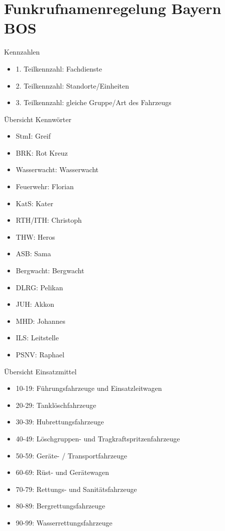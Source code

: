 \section{Funkrufnamenregelung Bayern BOS}
\begin{normbox}{Kennzahlen}
    \begin{itemize}
        \item 1. Teilkennzahl: Fachdienste
        \item 2. Teilkennzahl: Standorte/Einheiten
        \item 3. Teilkennzahl: gleiche Gruppe/Art des Fahrzeugs
    \end{itemize}
\end{normbox}
\begin{hintbox}{Übersicht Kennwörter}
    \begin{multicols}{2}
        \begin{itemize}
            \item StmI: Greif
            \item BRK: Rot Kreuz 
            \item Wasserwacht: Wasserwacht 
            \item Feuerwehr: Florian
            \item KatS: Kater 
            \item RTH/ITH: Christoph
            \item THW: Heros
            \item ASB: Sama
            \item Bergwacht: Bergwacht
            \item DLRG: Pelikan
            \item JUH: Akkon
            \item MHD: Johannes 
            \item ILS: Leitstelle
            \item PSNV: Raphael
        \end{itemize}
    \end{multicols}
\end{hintbox}
\begin{hintbox}{Übersicht Einsatzmittel}
    \begin{itemize}
        \item 10-19: Führungsfahrzeuge und Einsatzleitwagen
        \item 20-29: Tanklöschfahrzeuge
        \item 30-39: Hubrettungsfahrzeuge
        \item 40-49: Löschgruppen- und Tragkraftspritzenfahrzeuge
        \item 50-59: Geräte- / Transportfahrzeuge
        \item 60-69: Rüst- und Gerätewagen
        \item 70-79: Rettungs- und Sanitätsfahrzeuge
        \item 80-89: Bergrettungsfahrzeuge
        \item 90-99: Wasserrettungsfahrzeuge
    \end{itemize}
\end{hintbox}
